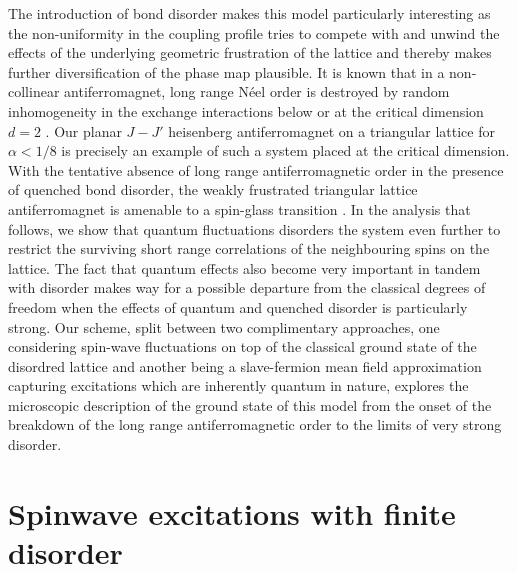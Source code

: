 \documentclass[aps,prb,twocolumn,showpacs]{revtex4-1}
\begin{document}
The introduction of bond disorder makes this model particularly interesting as the
non-uniformity in the coupling profile tries to compete with and unwind the effects 
of the underlying geometric frustration of the lattice and thereby makes further 
diversification of the phase map plausible. It is known that in a non-collinear 
antiferromagnet, long range N\'eel order is destroyed by random inhomogeneity in the 
exchange interactions below or at the critical dimension $d=2$
\cite{Dey-Vojta-disordered-non-collinear-2018}. Our planar
$J-J'$ heisenberg antiferromagnet on a triangular lattice for $\alpha < 1/8$ is 
precisely an example of such a system placed at the critical dimension. With the 
tentative absence of long range antiferromagnetic order in the presence of quenched 
bond disorder\cite{Watanabe-disordered-triangular-2014,
Dey-Vojta-disordered-non-collinear-2018}, the weakly frustrated 
triangular lattice antiferromagnet is amenable to a spin-glass transition
\cite{Andreanov-Chalker-frust.-dis.-magnet-2010}. In the analysis that follows, we 
show that quantum fluctuations disorders the system even further to restrict the 
surviving short range correlations of the neighbouring spins
on the lattice. The fact that quantum effects also become very important in tandem 
with disorder makes way for a possible departure from the classical degrees of 
freedom when the effects of quantum and quenched disorder is particularly strong. 
Our scheme, split between two complimentary approaches, one considering spin-wave 
fluctuations on top of the classical ground state of the disordred lattice and another 
being a slave-fermion mean field approximation capturing excitations which are 
inherently quantum in nature, explores the microscopic description of the ground state 
of this model from the onset of the breakdown of the long range antiferromagnetic order 
to the limits of very strong disorder.

\section{Spinwave excitations with finite disorder}
\end{document}
